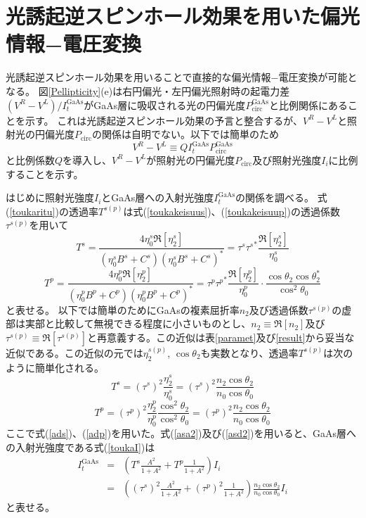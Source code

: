 \section{光誘起逆スピンホール効果を用いた偏光情報−電圧変換}


光誘起逆スピンホール効果を用いることで直接的な偏光情報−電圧変換が可能となる。
図\ref{Pellipticity}(e)は右円偏光・左円偏光照射時の起電力差$(V^R-V^L)/I_t^\text{GaAs}$がGaAs層に吸収される光の円偏光度$P^\text{GaAs}_\text{circ}$と比例関係にあることを示す。
これは光誘起逆スピンホール効果の予言と整合するが、$V^R-V^L$と照射光の円偏光度$P_\text{circ}$の関係は自明でない。以下では簡単のため
\begin{equation}
V^R-V^L\equiv  Q {I_{t}^\text{GaAs}}P^\text{GaAs}_\text{circ}\label{henkohirei}
\end{equation}
と比例係数$Q$を導入し、$V^R-V^L$が照射光の円偏光度$P_\text{circ}$及び照射光強度$I_i$に比例することを示す。




はじめに照射光強度$I_i$とGaAs層への入射光強度$I_t^\text{GaAs}$の関係を調べる。
式(\ref{toukaritu})の透過率$T^{s(p)}$は式(\ref{toukakeisuus})、(\ref{toukakeisuup})の透過係数$\tau^{s(p)}$を用いて
\begin{equation}
T^s=\frac{4\eta ^{s}_{0}  \Re[\eta ^{s}_{2}]}{(\eta ^{s}_{0}B^s+C^s)(\eta ^{s}_{0}B^s+C^s)^{\ast }}
=\tau ^s{\tau ^{s}}^{\ast }\frac{\Re[\eta ^{s}_{2}]}{\eta ^{s}_{0}}
\end{equation}
\begin{equation}
T^p=\frac{4\eta ^{p}_{0}  \Re[\eta ^{p}_{2}]}{(\eta ^{p}_{0}B^p+C^p)(\eta ^{p}_{0}B^p+C^p)^{\ast }}
=\tau ^p{\tau ^p}^{\ast } \frac{\Re[\eta ^{p}_{2}]}{\eta ^{p}_{0}}\cdot \frac{\cos{\theta _2}\cos{\theta _{2}^{\ast }}}{\cos^2{\theta _0}}
\end{equation}
と表せる。
以下では簡単のためにGaAsの複素屈折率$n_2$及び透過係数$\tau^{s(p)}$の虚部は実部と比較して無視できる程度に小さいものとし、$n_2\equiv \Re[n_2]$及び$\tau^{s(p)}\equiv\Re[\tau^{s(p)}]$と再意義する。この近似は表\ref{paramet}及び\ref{result}から妥当な近似である。この近似の元では$\eta_2^{s(p)}$, $\cos\theta_2$も実数となり、透過率$T^{s(p)}$は次のように簡単化される。
\begin{equation}
T^s=({\tau ^s})^2 \frac{\eta ^{s}_{2}}{\eta ^{s}_{0}}=({\tau ^s})^2 \frac{n_2\cos\theta_2}{n_0\cos\theta_0}\label{asa2}
\end{equation}
\begin{equation}
T^p=({\tau ^p})^2 \frac{\eta ^{p}_{2}}{\eta ^{p}_{0}}\frac{\cos^2{\theta _2}}{\cos^2{\theta _0}}=({\tau ^p})^2 \frac{n_2\cos\theta_2}{n_0\cos\theta_0}\label{asd2}
\end{equation}
ここで式(\ref{ads})、(\ref{adp})を用いた。式(\ref{asa2})及び(\ref{asd2})を用いると、GaAs層への入射光強度である式(\ref{toukaI})は
\begin{eqnarray}
I_t^\text{GaAs}&=&\left( T^s\frac{A^2}{1+A^2}+T^p\frac{1}{1+A^2}\right) I_i \nonumber\\
&=& \left( ({\tau^s})^2\frac{A^2}{1+A^2}+({\tau^p})^2\frac{1}{1+A^2}\right) \frac{n_2\cos\theta_2}{n_0\cos\theta_0}I_i\label{intG}
\end{eqnarray}
と表せる。

